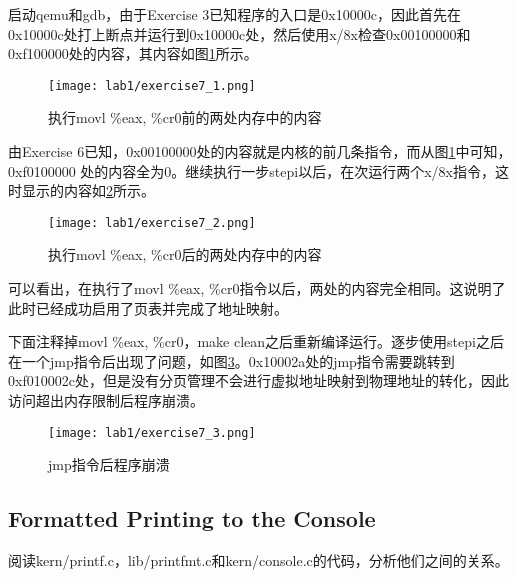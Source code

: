 \begin{exerciseSolution}{7}
\par 启动qemu和gdb，由于Exercise 3已知程序的入口是0x10000c，因此首先在0x10000c处打上断点并运行到0x10000c处，然后使用x/8x检查0x00100000和0xf100000处的内容，其内容如图\ref{fig:exercise7_1}所示。
\begin{figure}[htb]
    \centering
    \texttt{[image: lab1/exercise7\_1.png]}
    \caption{执行movl \%eax, \%cr0前的两处内存中的内容}
    \label{fig:exercise7_1}
\end{figure}
\par 由Exercise 6已知，0x00100000处的内容就是内核的前几条指令，而从图\ref{fig:exercise7_1}中可知，0xf0100000 处的内容全为0。继续执行一步stepi以后，在次运行两个x/8x指令，这时显示的内容如\ref{fig:exercise7_2}所示。
\begin{figure}[htb]
    \centering
    \texttt{[image: lab1/exercise7\_2.png]}
    \caption{执行movl \%eax, \%cr0后的两处内存中的内容}
    \label{fig:exercise7_2}
\end{figure}
\par 可以看出，在执行了movl \%eax, \%cr0指令以后，两处的内容完全相同。这说明了此时已经成功启用了页表并完成了地址映射。
\par 下面注释掉movl \%eax, \%cr0，make clean之后重新编译运行。逐步使用stepi之后在一个jmp指令后出现了问题，如图\ref{fig:exercise7_3}。0x10002a处的jmp指令需要跳转到0xf010002c处，但是没有分页管理不会进行虚拟地址映射到物理地址的转化，因此访问超出内存限制后程序崩溃。
\begin{figure}[htb]
    \centering
    \texttt{[image: lab1/exercise7\_3.png]}
    \caption{jmp指令后程序崩溃}
    \label{fig:exercise7_3}
\end{figure}
\FloatBarrier
\end{exerciseSolution}

\subsection{Formatted Printing to the Console}
\par 阅读kern/printf.c，lib/printfmt.c和kern/console.c的代码，分析他们之间的关系。


